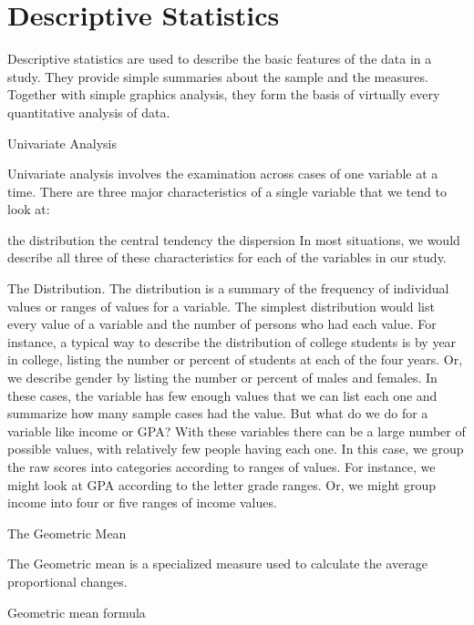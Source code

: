 \chapter{Descriptive Statistics}
Descriptive statistics are used to describe the basic features of the data in a study. They provide simple summaries about the sample and the measures. Together with simple graphics analysis, they form the basis of virtually every quantitative analysis of data.



Univariate Analysis

Univariate analysis involves the examination across cases of one variable at a time. There are three major characteristics of a single variable that we tend to look at:

the distribution
the central tendency
the dispersion
In most situations, we would describe all three of these characteristics for each of the variables in our study.




The Distribution. The distribution is a summary of the frequency of individual values or ranges of values for a variable. The simplest distribution would list every value of a variable and the number of persons who had each value. For instance, a typical way to describe the distribution of college students is by year in college, listing the number or percent of students at each of the four years. Or, we describe gender by listing the number or percent of males and females. In these cases, the variable has few enough values that we can list each one and summarize how many sample cases had the value. But what do we do for a variable like income or GPA? With these variables there can be a large number of possible values, with relatively few people having each one. In this case, we group the raw scores into categories according to ranges of values. For instance, we might look at GPA according to the letter grade ranges. Or, we might group income into four or five ranges of income values.



The Geometric Mean

The Geometric mean is a specialized measure used to calculate the average proportional changes.

Geometric mean formula

